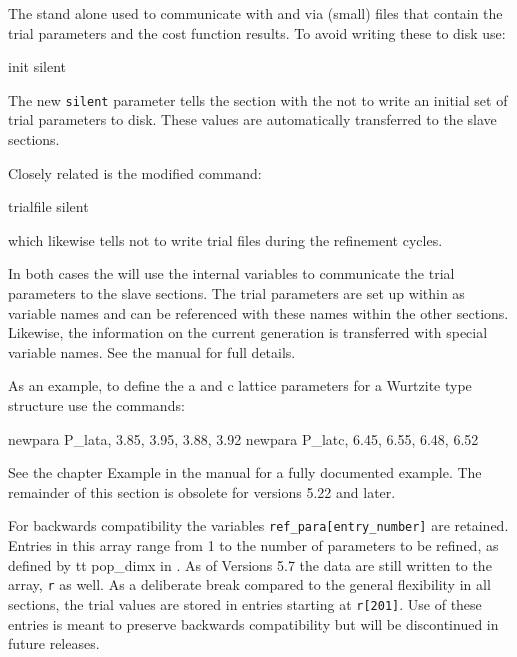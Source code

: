 The stand alone \Diffev used to communicate with \Discus and \Kuplot via (small) 
files that contain the trial parameters and the cost function results.
To avoid writing these to disk use:
\begin{MacVerbatim}
  init silent
\end{MacVerbatim}
The new {\tt silent} parameter tells the \Diffev section with the \Suite 
not to write an initial set of
trial parameters to disk. These values are automatically transferred to the 
slave sections.

Closely related is the modified command:
\begin{MacVerbatim}
  trialfile silent
\end{MacVerbatim}
which likewise tells \Diffev not to write trial files during the refinement
cycles.

In both cases the \Suite will use the internal variables 
to communicate the trial parameters to the slave sections. 
The trial parameters are set up within 
\href{./diffev\_man.pdf}\Diffev as variable names and can 
be referenced with these names within the other sections.
Likewise, the information on the current generation is transferred with 
special variable names. See the 
\href{./diffev\_man.pdf}{\Diffev}  
manual for full details.

As an example, to define the a and c lattice parameters for a 
Wurtzite type structure use the commands:
\begin{MacVerbatim}
newpara P_lata,  3.85, 3.95, 3.88, 3.92
newpara P_latc,  6.45, 6.55, 6.48, 6.52
\end{MacVerbatim}

See the chapter Example in the \Diffev manual for a fully documented
example. The remainder of this section is obsolete for versions 5.22 and 
later.

For backwards compatibility the variables {\tt ref\_para[entry\_number]}
are retained.
  Entries in this array
range from 1 to the number of parameters to be refined, as defined
by {tt pop\_dimx} in \diffev.
As of Versions 5.7 the data are still written to the array, {\tt r} as 
well. As a deliberate break compared
to the general flexibility in all \Suite sections, the trial values are 
stored in entries starting at {\tt r[201]}. Use of these entries is meant 
to preserve backwards compatibility but will be discontinued in 
future releases.

